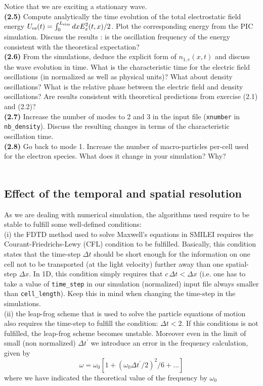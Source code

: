 \documentclass[11pt,a4paper]{article}
\begin{document}
Notice that we are exciting a stationary wave. \\
{\bf (2.5)} Compute analytically the time evolution of the total electrostatic field energy $U_{\rm es}(t) = \int_{0}^{L_{\rm sim}} dx E_x^2(t,x)/2$. Plot the corresponding energy from the PIC simulation. Discuss the results : is the oscillation frequency of the energy consistent with the theoretical expectation?\\
{\bf (2.6)} From the simulations, deduce the explicit form of $n_{1,e}(x,t)$ and discuss the wave evolution in time. What is the characteristic time for the electric field oscillations (in normalized as well as physical units)? What about density oscillations? What is the relative phase between the electric field and density oscillations?  Are results consistent with theoretical predictions from exercise (2.1) and (2.2)?\\
{\bf (2.7)} Increase the number of modes to 2 and 3 in the input file (\texttt{xnumber} in \texttt{nb\_density}). Discuss the resulting changes in terms of the characteristic oscillation time.\\
{\bf (2.8)} Go back to mode 1. Increase the number of macro-particles per-cell used for the electron species. What does it change in your simulation? Why?\\
 \\

\subsection*{Effect of the temporal and spatial resolution}

As we are dealing with numerical simulation, the algorithms used require to be stable to fulfill some well-defined conditions:\\
(i) the FDTD method used to solve Maxwell's equations in SMILEI requires the Courant-Friedrichs-Lewy (CFL) condition to be fulfilled. Basically, this condition states that the time-step $\Delta t$ should be short enough for the information on one cell not to be transported (at the light velocity) further away than one spatial-step $\Delta x$. In 1D, this condition simply requires that $c\,\Delta t < \Delta x$ (i.e. one has to take a value of \texttt{time\_step} in our simulation (normalized) input file always smaller than \texttt{cell\_length}). Keep this in mind when changing the time-step in the simulations.\\
(ii) the leap-frog scheme that is used to solve the particle equations of motion also requires the time-step to fulfill the condition: $\Delta t < 2$. If this conditions is not fulfilled, the leap-frog scheme becomes unstable.
Moreover even in the limit of small (non normalized) $\Delta t^\prime$ we introduce an error in the frequency calculation, given by 
$$\omega = \omega_0  [1+ (\omega_0 \Delta t^\prime/2 )^2/6+... ]$$
where we have indicated the theoretical value of the frequency  by $\omega_0$
\end{document}
